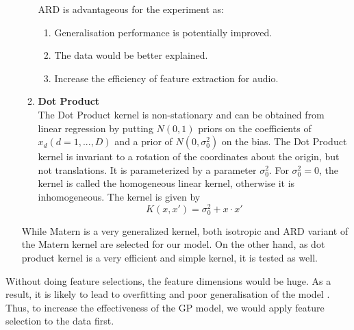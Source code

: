 \documentclass{article}
\begin{document}
\begin{enumerate}
\begin{enumerate}
			ARD is advantageous for the experiment as: 
			\begin{enumerate}
				\item Generalisation performance is potentially improved.
				\item The data would be better explained.
				\item Increase the efficiency of feature extraction for audio.
			\end{enumerate}
			\cite{Cawley2014}
			
			\item \textbf{Dot Product}\\
			The Dot Product kernel is non-stationary and can be obtained from linear regression by putting $N(0,1)$ priors on the coefficients 
			of $x_{d} (d = 1, . . . , D)$ and a prior of $N(0, \sigma_{0}^{2})$ on the bias. 
			The Dot Product kernel is invariant to a rotation of the coordinates about the origin, but not translations. 
			It is parameterized by a parameter $\sigma_{0}^{2}$. For $\sigma_{0}^{2} = 0$, 
			the kernel is called the homogeneous linear kernel, otherwise it is inhomogeneous. The kernel is given by
			\begin{equation}\label{eq:kernel_dp}
				K(x,x') = \sigma_{0}^{2} + x \cdot x'  
			\end{equation}
		\end{enumerate}

		While Matern is a very generalized kernel, both isotropic and ARD variant of the Matern kernel are selected for our model. 
		On the other hand, as dot product kernel is a very efficient and simple kernel, it is tested as well.
	\end{enumerate}

	Without doing feature selections, the feature dimensions would be huge. 
	As a result, it is likely to lead to overfitting and poor generalisation of the model \cite{Cawley2014}. 
	Thus, to increase the effectiveness of the GP model, we would apply feature selection to the data first.
\end{document}
